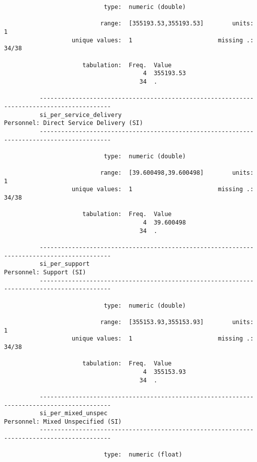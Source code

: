 \documentclass{article}
\begin{document}
\begin{verbatim}
                            type:  numeric (double)
          
                           range:  [355193.53,355193.53]        units:  1
                   unique values:  1                        missing .:  34/38
          
                      tabulation:  Freq.  Value
                                       4  355193.53
                                      34  .
          
          ------------------------------------------------------------------------------------------
          si_per_service_delivery                            Personnel: Direct Service Delivery (SI)
          ------------------------------------------------------------------------------------------
          
                            type:  numeric (double)
          
                           range:  [39.600498,39.600498]        units:  1
                   unique values:  1                        missing .:  34/38
          
                      tabulation:  Freq.  Value
                                       4  39.600498
                                      34  .
          
          ------------------------------------------------------------------------------------------
          si_per_support                                                     Personnel: Support (SI)
          ------------------------------------------------------------------------------------------
          
                            type:  numeric (double)
          
                           range:  [355153.93,355153.93]        units:  1
                   unique values:  1                        missing .:  34/38
          
                      tabulation:  Freq.  Value
                                       4  355153.93
                                      34  .
          
          ------------------------------------------------------------------------------------------
          si_per_mixed_unspec                                      Personnel: Mixed Unspecified (SI)
          ------------------------------------------------------------------------------------------
          
                            type:  numeric (float)
          

\end{verbatim}
\end{document}
